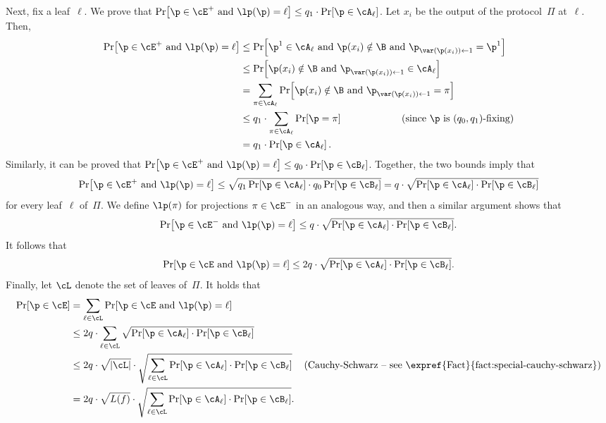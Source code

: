 \documentclass{toc}
\begin{document}
Next, fix a leaf~$\ell$. We prove that $\Pr\!\left[\p\in\cE^{+}\text{ and }\lp(\p)=\ell\right]\le q_{1}\cdot\Pr\!\left[\p\in\cA_{\ell}\right]$.
Let $x_{i}$ be the output of the protocol~$\Pi$ at~$\ell$. Then,
\begin{align*}
\Pr\!\left[\p\in\cE^{+}\text{ and }\lp(\p)=\ell\right] & \le\Pr\!\left[\p^{1}\in\cA_{\ell}\text{ and }\p(x_{i})\notin\B\text{ and }\p_{\var(\p(x_{i}))\gets1}=\p^{1}\right]\\
 & \le\Pr\!\left[\p(x_{i})\notin\B\text{ and }\p_{\var(\p(x_{i}))\gets1}\in\cA_{\ell}\right]\\
 & =\sum_{\pi\in\cA_{\ell}}\Pr\!\left[\p(x_{i})\notin\B\text{ and }\p_{\var(\p(x_{i}))\gets1}=\pi\right]\\
 & \le q_{1}\cdot\sum_{\pi\in\cA_{\ell}}\Pr\!\left[\p=\pi\right]\qquad\qquad\qquad\text{(since \ensuremath{\p} is \ensuremath{(q_{0},q_{1})}-fixing)}\\
 & =q_{1}\cdot\Pr\!\left[\p\in\cA_{\ell}\right].
\end{align*}
Similarly, it can be proved that $\Pr\!\left[\p\in\cE^{+}\text{ and }\lp(\p)=\ell\right]\le q_{0}\cdot\Pr\!\left[\p\in\cB_{\ell}\right]$.
Together, the two bounds imply that 
\[
\Pr\!\left[\p\in\cE^{+}\text{ and }\lp(\p)=\ell\right]\le\sqrt{q_{1}\Pr\!\left[\p\in\cA_{\ell}\right]\cdot q_{0}\Pr\!\left[\p\in\cB_{\ell}\right]}=q\cdot\sqrt{\Pr\!\left[\p\in\cA_{\ell}\right]\cdot\Pr\!\left[\p\in\cB_{\ell}\right]}
\]
for every leaf~$\ell$ of~$\Pi$. We define $\lp(\pi)$ for projections
$\pi\in\cE^{-}$ in an analogous way, and then a similar argument
shows that 
\[
\Pr\!\left[\p\in\cE^{-}\text{ and }\lp(\p)=\ell\right]\le q\cdot\sqrt{\Pr\!\left[\p\in\cA_{\ell}\right]\cdot\Pr\!\left[\p\in\cB_{\ell}\right]}.
\]
It follows that 
\[
\Pr\!\left[\p\in\cE\text{ and }\lp(\p)=\ell\right]\le2q\cdot\sqrt{\Pr\!\left[\p\in\cA_{\ell}\right]\cdot\Pr\!\left[\p\in\cB_{\ell}\right]}.
\]
Finally, let $\cL$ denote the set of leaves of~$\Pi$. It holds
that 
\begin{align*}
\Pr\!\left[\p\in\cE\right] & =\sum_{\ell\in\cL}\Pr\!\left[\p\in\cE\text{ and }\lp(\p)=\ell\right]\\
 & \le2q\cdot\sum_{\ell\in\cL}\sqrt{\Pr\!\left[\p\in\cA_{\ell}\right]\cdot\Pr\!\left[\p\in\cB_{\ell}\right]}\\
 & \le2q\cdot\sqrt{\left|\cL\right|}\cdot\sqrt{\sum_{\ell\in\cL}\Pr\!\left[\p\in\cA_{\ell}\right]\cdot\Pr\!\left[\p\in\cB_{\ell}\right]} & \text{(Cauchy-Schwarz -- see~\expref{Fact}{fact:special-cauchy-schwarz})}\\
 & =2q\cdot\sqrt{L(f)}\cdot\sqrt{\sum_{\ell\in\cL}\Pr\!\left[\p\in\cA_{\ell}\right]\cdot\Pr\!\left[\p\in\cB_{\ell}\right]}.
\end{align*}
\end{document}
